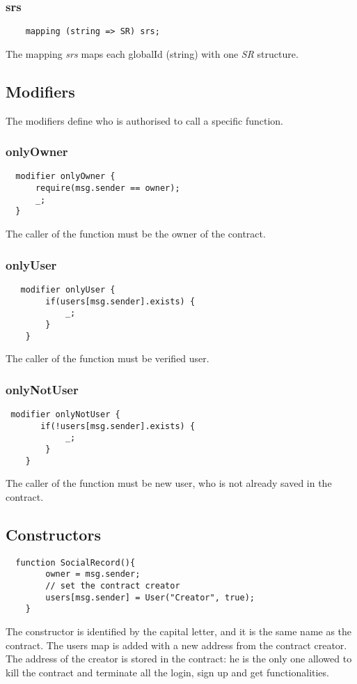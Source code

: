 \subsubsection{srs}
\begin{lstlisting}
    mapping (string => SR) srs;
\end{lstlisting}
The mapping \textit{srs} maps each globalId (string) with one \textit{SR} structure.

\subsection{Modifiers}
The modifiers define who is authorised to call a specific function.
\subsubsection{onlyOwner}
\begin{lstlisting}
  modifier onlyOwner {
      require(msg.sender == owner);
      _;
  }
\end{lstlisting}
The caller of the function must be the owner of the contract.

\subsubsection{onlyUser}
\begin{lstlisting}
   modifier onlyUser {
        if(users[msg.sender].exists) {
            _;
        }
    }
\end{lstlisting}
The caller of the function must be verified user.

\subsubsection{onlyNotUser}
\begin{lstlisting}
 modifier onlyNotUser {
       if(!users[msg.sender].exists) {
            _;
        }
    }
\end{lstlisting}
The caller of the function must be new user, who is not already saved in the contract.

\subsection{Constructors}
\begin{lstlisting}
  function SocialRecord(){
        owner = msg.sender;
        // set the contract creator
        users[msg.sender] = User("Creator", true);
    }
\end{lstlisting}
The constructor is identified by the capital letter, and it is the same name as the contract.
The users map is added with a new address from the contract creator.
The address of the creator is stored in the contract: he is the only one allowed to kill the contract and terminate all the login, sign up and get functionalities.

